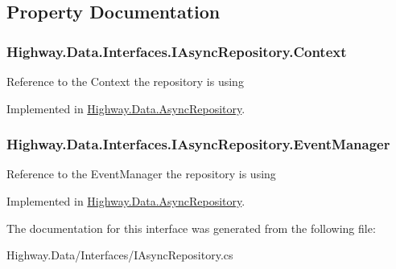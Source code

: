 \subsection{Property Documentation}
\hypertarget{interface_highway_1_1_data_1_1_interfaces_1_1_i_async_repository_a03e1d3bb759c50309a4be719eca25a0f}{
\subsubsection[{Context}]{ Highway.\-Data.\-Interfaces.\-I\-Async\-Repository.\-Context\hspace{0.3cm}{\ttfamily [get]}}}\label{interface_highway_1_1_data_1_1_interfaces_1_1_i_async_repository_a03e1d3bb759c50309a4be719eca25a0f}


Reference to the Context the repository is using 



Implemented in \hyperlink{class_highway_1_1_data_1_1_async_repository_abfd6073ad2ad20eebaf97568c7ed8d7e}{Highway.\-Data.\-Async\-Repository}.

\hypertarget{interface_highway_1_1_data_1_1_interfaces_1_1_i_async_repository_ad3c1510134e22665788e2f8eccd954f0}{
\subsubsection[{Event\-Manager}]{ Highway.\-Data.\-Interfaces.\-I\-Async\-Repository.\-Event\-Manager\hspace{0.3cm}{\ttfamily [get]}}}\label{interface_highway_1_1_data_1_1_interfaces_1_1_i_async_repository_ad3c1510134e22665788e2f8eccd954f0}


Reference to the Event\-Manager the repository is using 



Implemented in \hyperlink{class_highway_1_1_data_1_1_async_repository_ab41ad1eec675e831aba15b677d27717e}{Highway.\-Data.\-Async\-Repository}.



The documentation for this interface was generated from the following file\-:\begin{DoxyCompactItemize}
\item 
Highway.\-Data/\-Interfaces/I\-Async\-Repository.\-cs\end{DoxyCompactItemize}
